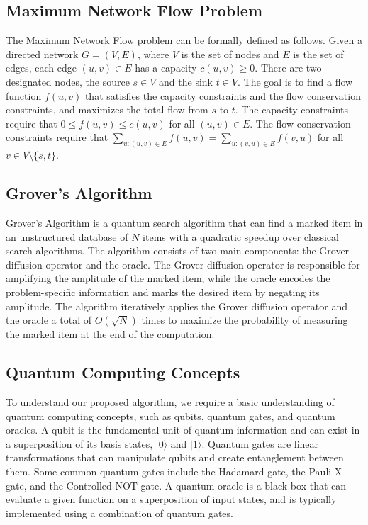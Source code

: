 \subsection{Maximum Network Flow Problem}\label{subsec:max_net_flow_problem}
The Maximum Network Flow problem can be formally defined as follows. Given a directed network $G = (V, E)$, where $V$ is the set of nodes and $E$ is the set of edges, each edge $(u, v) \in E$ has a capacity $c(u, v) \ge 0$. There are two designated nodes, the source $s \in V$ and the sink $t \in V$. The goal is to find a flow function $f(u, v)$ that satisfies the capacity constraints and the flow conservation constraints, and maximizes the total flow from $s$ to $t$. The capacity constraints require that $0 \le f(u, v) \le c(u, v)$ for all $(u, v) \in E$. The flow conservation constraints require that $\sum_{u:(u,v) \in E} f(u, v) = \sum_{u:(v,u) \in E} f(v, u)$ for all $v \in V \setminus \{s, t\}$.

\subsection{Grover's Algorithm}\label{subsec:grovers_algorithm}
Grover's Algorithm is a quantum search algorithm that can find a marked item in an unstructured database of $N$ items with a quadratic speedup over classical search algorithms. The algorithm consists of two main components: the Grover diffusion operator and the oracle. The Grover diffusion operator is responsible for amplifying the amplitude of the marked item, while the oracle encodes the problem-specific information and marks the desired item by negating its amplitude. The algorithm iteratively applies the Grover diffusion operator and the oracle a total of $O(\sqrt{N})$ times to maximize the probability of measuring the marked item at the end of the computation.

\subsection{Quantum Computing Concepts}\label{subsec:quantum_computing_concepts}
To understand our proposed algorithm, we require a basic understanding of quantum computing concepts, such as qubits, quantum gates, and quantum oracles. A qubit is the fundamental unit of quantum information and can exist in a superposition of its basis states, $|0\rangle$ and $|1\rangle$. Quantum gates are linear transformations that can manipulate qubits and create entanglement between them. Some common quantum gates include the Hadamard gate, the Pauli-X gate, and the Controlled-NOT gate. A quantum oracle is a black box that can evaluate a given function on a superposition of input states, and is typically implemented using a combination of quantum gates.

